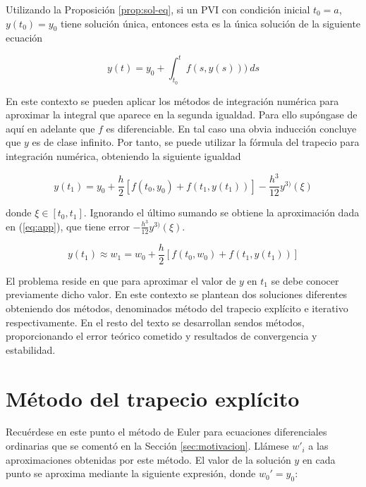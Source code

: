 \documentclass{article}
\theoremstyle{theorem-style}  %
\theoremstyle{definition-style}
\theoremstyle{example-style}
\begin{document}
	
	Utilizando la Proposición \ref{prop:sol-eq}, si un PVI con condición inicial $t_0 = a$, $y(t_0) = y_0$ tiene solución única, entonces esta es la única solución de la siguiente ecuación
	
	\begin{equation}
		y(t)  = y_0 + \int_{t_0}^{t} f(s,y(s))) \ ds
	\end{equation}
	
	En este contexto se pueden aplicar los métodos de integración numérica para aproximar la integral que aparece en la segunda igualdad. Para ello supóngase de aquí en adelante que $f$ es diferenciable. En tal caso una obvia inducción concluye que $y$ es de clase infinito. Por tanto, se puede utilizar la fórmula del trapecio para integración numérica, obteniendo la siguiente igualdad
	
	\begin{equation} \label{eq:trapecio-igualdad}
		y(t_{1}) = y_0 + \frac{h}{2} \left[f(t_0,y_0) + f(t_1, y(t_1))\right] - \frac{h^3}{12}y^{3)}(\xi)
	\end{equation}


	donde $\xi \in [t_0, t_1]$. Ignorando el último sumando se obtiene la aproximación dada en (\ref{eq:app}), que tiene error $- \frac{h^3}{12}y^{3)}(\xi)$.

	\begin{equation} \label{eq:app}
		y(t_1) \approx w_1 = w_0 + \frac{h}{2} \left[f(t_0,w_0) + f(t_1, y(t_1))\right]
	\end{equation}

	El problema reside en que para aproximar el valor de $y$ en $t_1$ se debe conocer previamente dicho valor. En este contexto se plantean dos soluciones diferentes obteniendo dos métodos, denominados método del trapecio explícito e iterativo respectivamente. En el resto del texto se desarrollan sendos métodos, proporcionando el error teórico cometido y resultados de convergencia y estabilidad.
	

\section{Método del trapecio explícito}	 \label{sec:trapecio-explicito}
		
		Recuérdese en este punto el método de Euler para ecuaciones diferenciales ordinarias que se comentó en la Sección \ref{sec:motivacion}. Llámese $w'_i$ a las aproximaciones obtenidas por este método. El valor de la solución $y$ en cada punto se aproxima mediante la siguiente expresión, donde $w_0' = y_0$:
		
\end{document}

